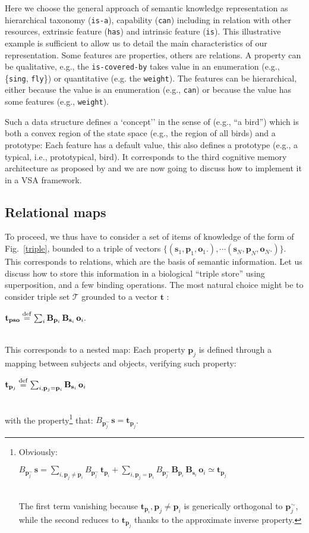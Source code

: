 \documentclass[sn-mathphys]{sn-jnl}
\newcommand{\defq}{\stackrel {\rm def}{=}}
\newcommand{\eqline}[1]{~\vspace{0.1cm}\\\centerline{$#1$}\vspace{0.1cm}\\}
\begin{document}
Here we choose the \cite{mcclelland_parallel_2003} general approach of semantic knowledge representation as hierarchical taxonomy ({\tt is-a}), capability ({\tt can}) including in relation with other resources, extrinsic feature ({\tt has}) and intrinsic feature ({\tt is}).
This illustrative example is sufficient to allow us to detail the main characteristics of our representation.
Some features are properties, others are relations. A property can be qualitative, e.g., the {\tt is-covered-by} takes value in an enumeration (e.g., \{{\tt sing}, {\tt fly}\}) or quantitative (e.g. the {\tt weight}). The features can be hierarchical, either because the value is an enumeration (e.g., {\tt can}) or because the value has some features (e.g., {\tt weight}).

Such a data structure defines a `concept'' in the sense of \cite{gardenfors_conceptual_2004} (e.g., ``a bird'') which is both a convex region of the state space (e.g., the region of all birds) and a prototype: Each feature has a default value, this also defines a prototype (e.g., a typical, i.e., prototypical, bird). It corresponds to the third cognitive memory architecture as proposed by \cite{eichenbaum_memory_2017} and we are now going to discuss how to implement it in a VSA framework.

\subsection{Relational maps} \label{relational-map}

To proceed, we thus have to consider a set of items of knowledge of the form of Fig.~\ref{triple}, bounded to a triple of vectors $\{(\mathbf{s}_1 ,  \mathbf{p}_1 ,  \mathbf{o}_1.), \cdots (\mathbf{s}_N ,  \mathbf{p}_N ,  \mathbf{o}_N.)\}$. This corresponds to relations, which are the basis of semantic information. Let us discuss how to store this information in a biological ``triple store'' using superposition, and a few binding operations. The most natural choice might be to consider triple set $\mathcal{T}$ grounded to a vector $\mathbf{t}$ :
\eqline{\mathbf{t}_{\mathbf{pso}} \defq \sum_i \mathbf{B}_{\mathbf{p}_i} \, \mathbf{B}_{\mathbf{s}_i} \, \mathbf{o}_i.}

This corresponds to a nested map: Each property $\mathbf{p}_j$ is defined through a mapping between subjects and objects, verifying such property:
\eqline{\mathbf{t}_{\mathbf{p}_j} \defq \sum_{i, \mathbf{p}_j = \mathbf{p}_i} \mathbf{B}_{\mathbf{s}_i} \, \mathbf{o}_i}
with the property\footnote{
Obviously:
\eqline{B_{\mathbf{p}_j^\sim} \, \mathbf{s} =
  \sum_{i, \mathbf{p}_j \neq \mathbf{p}_i} B_{\mathbf{p}_j^\sim} \, \mathbf{t}_{\mathbf{p}_i} +
  \sum_{i, \mathbf{p}_j = \mathbf{p}_i}  B_{\mathbf{p}_j^\sim} \, \mathbf{B}_{\mathbf{p}_i} \, \mathbf{B}_{\mathbf{s}_i} \, \mathbf{o}_i \simeq \mathbf{t}_{\mathbf{p}_j}}
The first term vanishing because $\mathbf{t}_{\mathbf{p}_i}, \mathbf{p}_j \neq \mathbf{p}_i$ is generically orthogonal to $\mathbf{p}_j^\sim$, while the second reduces to $\mathbf{t}_{\mathbf{p}_j}$ thanks to the approximate inverse property.} that: $B_{\mathbf{p}_j^\sim} \, \mathbf{s} = \mathbf{t}_{\mathbf{p}_j}$.
\end{document}
